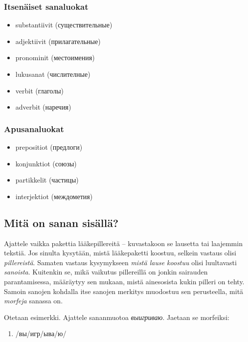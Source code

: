 \documentclass[]{scrartcl}
\providecommand{\tightlist}{%
  \setlength{\itemsep}{0pt}\setlength{\parskip}{0pt}}
\begin{document}
\subsubsection{Itsenäiset sanaluokat}\label{itsenuxe4iset-sanaluokat}

\begin{itemize}
\tightlist
\item
  substantiivit (существительные)
\item
  adjektiivit (прилагательные)
\item
  pronominit (местоимения)
\item
  lukusanat (числителные)
\item
  verbit (глаголы)
\item
  adverbit (наречия)
\end{itemize}

\subsubsection{Apusanaluokat}\label{apusanaluokat}

\begin{itemize}
\tightlist
\item
  prepositiot (предлоги)
\item
  konjunktiot (союзы)
\item
  partikkelit (частицы)
\item
  interjektiot (междометия)
\end{itemize}

\subsection{Mitä on sanan
sisällä?}\label{mituxe4-on-sanan-sisuxe4lluxe4}

Ajattele vaikka pakettia lääkepillereitä -- kuvastakoon se lausetta tai
laajemmin tekstiä. Jos sinulta kysytään, mistä lääkepaketti koostuu,
selkein vastaus olisi \emph{pillereistä}. Samaten vastaus kysymykseen
\emph{mistä lause koostuu} olisi luultavasti \emph{sanoista}. Kuitenkin
se, mikä vaikutus pillereillä on jonkin sairauden parantamisessa,
määräytyy sen mukaan, mistä ainesosista kukin pilleri on tehty. Samoin
sanojen kohdalla itse sanojen merkitys muodostuu sen perusteella, mitä
\emph{morfeja} sanassa on.

Otetaan esimerkki. Ajattele sananmuotoa \emph{выигриваю}. Jaetaan se
morfeiksi:

\begin{enumerate}
\def\labelenumi{(\arabic{enumi})}
\tightlist
\item
  /вы/игр/ыва/ю/
\end{enumerate}
\end{document}

